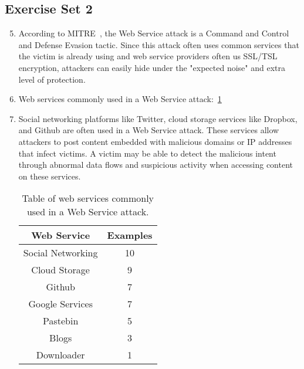 \documentclass[11pt]{article}
\begin{document}
\subsection*{Exercise Set 2}
\begin{enumerate}
  \setcounter{enumi}{4}
  \item According to MITRE~\cite{web-service}, the Web Service attack is a Command and Control
  and Defense Evasion tactic. Since this attack often uses common services that the victim
  is already using and web service providers often us SSL/TSL encryption, attackers can easily hide
  under the "expected noise" and extra level of protection.
  \item Web services commonly used in a Web Service attack:~\ref{table:web-services}
  \item Social networking platforms like Twitter, cloud storage services like Dropbox,
  and Github are often used in a Web Service attack. These services allow attackers
  to post content embedded with malicious domains or IP addresses that infect victims.
  A victim may be able to detect the malicious intent through abnormal data flows
  and suspicious activity when accessing content on these services.
  \begin{table}[h]
    \centering
    \begin{tabular}{ |c|c| }
      \hline
      \textbf{Web Service} & \textbf{Examples} \\
      \hline
      Social Networking & 10  \\
      Cloud Storage     & 9   \\
      Github            & 7   \\
      Google Services   & 7   \\
      Pastebin          & 5   \\
      Blogs             & 3   \\
      Downloader        & 1   \\
      \hline
    \end{tabular}
    \caption{\label{table:web-services}
    Table of web services commonly used in a Web Service attack.}
  \end{table}
\end{enumerate}
\end{document}
